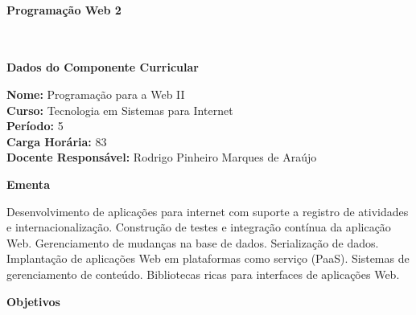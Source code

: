 \paragraph{Programação Web 2} \


\begin{snugshade}\begin{center}\textbf{
    Dados do Componente Curricular
}\end{center}\end{snugshade}

\noindent \textbf{Nome:}                Programação para a Web II
\\        \textbf{Curso:}               Tecnologia em Sistemas para Internet
\\        \textbf{Período:}             \unit{5}{\degree}
\\        \textbf{Carga Horária:}       \unit{83}{\hour}
\\        \textbf{Docente Responsável:} Rodrigo Pinheiro Marques de Araújo


\begin{snugshade}\begin{center}\textbf{
    Ementa
\vphantom{q}}\end{center}\end{snugshade}

\noindent
Desenvolvimento de aplicações para internet com suporte a registro de atividades e internacionalização. Construção de testes e integração contínua da aplicação Web. Gerenciamento de mudanças na base de dados. Serialização de dados. Implantação de aplicações Web em plataformas como serviço (PaaS). Sistemas de gerenciamento de conteúdo. Bibliotecas ricas para interfaces de aplicações Web.



\begin{snugshade}\begin{center}\textbf{
    Objetivos
}\end{center}\end{snugshade}

